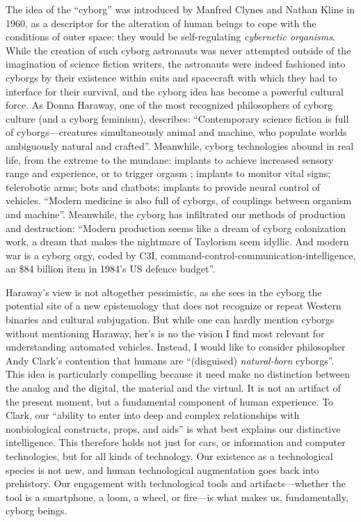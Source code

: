 The idea of the ``cyborg'' was introduced by Manfred Clynes and Nathan
Kline in 1960, as a descriptor for the alteration of human beings to
cope with the conditions of outer space: they would be self-regulating
\emph{cybernetic organisms}\cite[p. 66]{ekbia}. While the creation of
such cyborg astronauts was never attempted outside of the imagination
of science fiction writers, the astronauts were indeed fashioned into
cyborgs by their existence within suits and spacecraft with which they
had to interface for their survival, and the cyborg idea has become a
powerful cultural force. As Donna Haraway, one of the most recognized
philosophers of cyborg culture (and a cyborg feminism), describes:
``Contemporary science 
fiction is full of cyborgs---creatures simultaneously
animal and machine, who populate worlds ambiguously natural and
crafted''\cite[p. 117]{???-haraway}. Meanwhile, cyborg technologies
abound in real life, from the extreme to the mundane: implants to
achieve increased sensory range and experience, or to trigger orgasm
\cite[p. 64]{ekbia}; implants to monitor vital signs; telerobotic
arms; bots and chatbots; implants to provide neural control of
vehicles\cite[p. 65]{ekbia}. ``Modern medicine is also full of
cyborgs, of couplings between organism
and machine''\cite[p. 117]{???-haraway}. Meanwhile, the cyborg has
infiltrated our methods of production and destruction: ``Modern
production seems like a dream of cyborg colonization work, a dream
that makes the nightmare of Taylorism seem idyllic. And modern war is
a cyborg orgy, coded by C3I,
command-control-communication-intelligence, an \$84 billion item in 1984's US
defence budget''\cite[p. 118]{???-haraway}. 

Haraway's view is not altogether pessimistic, as she sees in the cyborg
the potential site of a new epistemology that does not recognize or
repeat Western binaries and cultural subjugation\cite[p.
  118-121]{???-haraway}. But while one can hardly mention cyborgs without
mentioning Haraway, her's is no the vision I find most relevant for
understanding automated vehicles. Instead, I would like to consider philosopher Andy
Clark's contention that humans are ``(disguised) \emph{natural-born}
cyborgs''\cite[p. 66]{ekbia}. This idea is particularly compelling
because it need make no distinction between the analog and the
digital, the material and the virtual. It is not an artifact of the
present moment, but a fundamental component of human experience. To
Clark, our ``ability to enter into deep and complex relationships with
nonbiological constructs, props, and aids'' is what best explains our
distinctive intelligence\cite[p. 66-67]{ekbia}. This therefore holds
not just for cars, or information and computer technologies, but for
all kinds of technology. Our existence as a technological species is
not new, and human technological augmentation goes back into
prehistory. Our engagement with technological tools and
artifacts---whether the tool is a smartphone, a loom, a wheel, or
fire---is what makes us, fundamentally, cyborg beings. 

